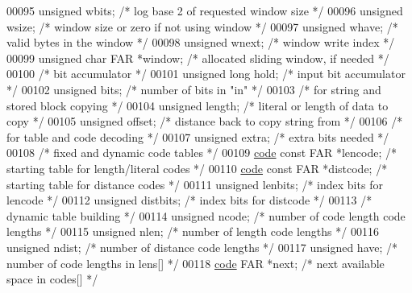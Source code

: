 \begin{DoxyCode}
00095     \textcolor{keywordtype}{unsigned} wbits;             \textcolor{comment}{/* log base 2 of requested window size */}
00096     \textcolor{keywordtype}{unsigned} wsize;             \textcolor{comment}{/* window size or zero if not using window */}
00097     \textcolor{keywordtype}{unsigned} whave;             \textcolor{comment}{/* valid bytes in the window */}
00098     \textcolor{keywordtype}{unsigned} wnext;             \textcolor{comment}{/* window write index */}
00099     \textcolor{keywordtype}{unsigned} \textcolor{keywordtype}{char} FAR *window;  \textcolor{comment}{/* allocated sliding window, if needed */}
00100         \textcolor{comment}{/* bit accumulator */}
00101     \textcolor{keywordtype}{unsigned} \textcolor{keywordtype}{long} hold;         \textcolor{comment}{/* input bit accumulator */}
00102     \textcolor{keywordtype}{unsigned} bits;              \textcolor{comment}{/* number of bits in "in" */}
00103         \textcolor{comment}{/* for string and stored block copying */}
00104     \textcolor{keywordtype}{unsigned} length;            \textcolor{comment}{/* literal or length of data to copy */}
00105     \textcolor{keywordtype}{unsigned} offset;            \textcolor{comment}{/* distance back to copy string from */}
00106         \textcolor{comment}{/* for table and code decoding */}
00107     \textcolor{keywordtype}{unsigned} extra;             \textcolor{comment}{/* extra bits needed */}
00108         \textcolor{comment}{/* fixed and dynamic code tables */}
00109     \hyperlink{structcode}{code} \textcolor{keyword}{const} FAR *lencode;    \textcolor{comment}{/* starting table for length/literal codes */}
00110     \hyperlink{structcode}{code} \textcolor{keyword}{const} FAR *distcode;   \textcolor{comment}{/* starting table for distance codes */}
00111     \textcolor{keywordtype}{unsigned} lenbits;           \textcolor{comment}{/* index bits for lencode */}
00112     \textcolor{keywordtype}{unsigned} distbits;          \textcolor{comment}{/* index bits for distcode */}
00113         \textcolor{comment}{/* dynamic table building */}
00114     \textcolor{keywordtype}{unsigned} ncode;             \textcolor{comment}{/* number of code length code lengths */}
00115     \textcolor{keywordtype}{unsigned} nlen;              \textcolor{comment}{/* number of length code lengths */}
00116     \textcolor{keywordtype}{unsigned} ndist;             \textcolor{comment}{/* number of distance code lengths */}
00117     \textcolor{keywordtype}{unsigned} have;              \textcolor{comment}{/* number of code lengths in lens[] */}
00118     \hyperlink{structcode}{code} FAR *next;             \textcolor{comment}{/* next available space in codes[] */}

\end{DoxyCode}

